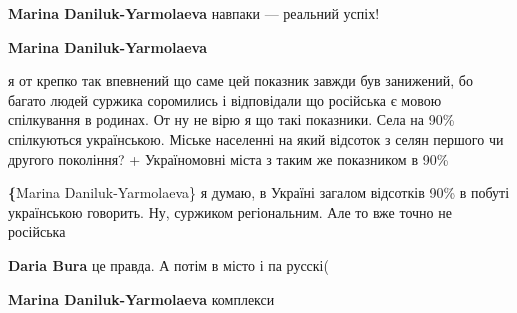 \begin{itemize}
 
\textbf{Marina Daniluk-Yarmolaeva} навпаки — реальний успіх!

 
\textbf{Marina Daniluk-Yarmolaeva} 

я от крепко так впевнений що саме цей
показник завжди був занижений, бо багато людей суржика соромились і відповідали
що російська є мовою спілкування в родинах. От ну не вірю я що такі показники.
Села на 90\% спілкуються українською. Міське населенні на який відсоток з селян
першого чи другого покоління? + Україномовні міста з таким же показником в 90\%

 
\textbf\{Marina Daniluk-Yarmolaeva\} я думаю, в Україні загалом відсотків 90\% в
побуті українською говорить. Ну, суржиком регіональним. Але то вже точно не
російська

 

\textbf{Daria Bura} це правда. А потім в місто і па русскі(

 
\textbf{Marina Daniluk-Yarmolaeva} комплекси
\end{itemize}

